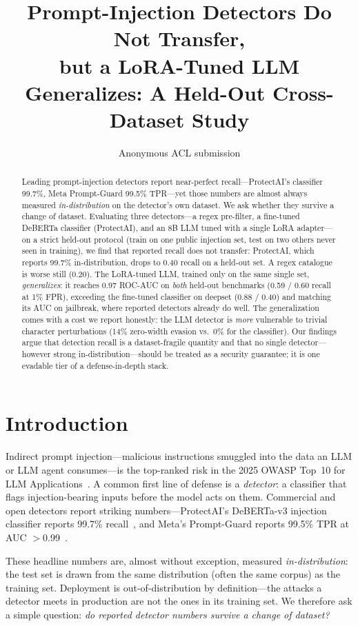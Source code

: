 \documentclass[11pt]{article}
\title{Prompt-Injection Detectors Do Not Transfer, \\ but a LoRA-Tuned LLM Generalizes:
A Held-Out Cross-Dataset Study}
\author{Anonymous ACL submission}
\begin{document}
\maketitle

\begin{abstract}
Leading prompt-injection detectors report near-perfect recall---ProtectAI's classifier 99.7\%,
Meta Prompt-Guard 99.5\% TPR---yet those numbers are almost always measured \emph{in-distribution}
on the detector's own dataset. We ask whether they survive a
change of dataset. Evaluating three detectors---a regex pre-filter, a fine-tuned DeBERTa classifier
(ProtectAI), and an 8B LLM tuned with a single LoRA adapter---on a strict held-out protocol (train
on one public injection set, test on two others never seen in training), we find that reported
recall does not transfer: ProtectAI, which reports 99.7\% in-distribution, drops to 0.40 recall on a
held-out set. A regex catalogue is worse still (0.20). The LoRA-tuned LLM, trained only on the same
single set, \emph{generalizes}: it reaches 0.97 ROC-AUC on \emph{both} held-out benchmarks
(0.59 / 0.60 recall at 1\% FPR), exceeding the fine-tuned classifier on deepset (0.88 / 0.40) and
matching its AUC on jailbreak, where reported detectors already do well. The generalization comes
with a cost we report honestly: the LLM detector is \emph{more} vulnerable to trivial character
perturbations (14\% zero-width evasion vs.\ 0\% for the classifier). Our findings argue that
detection recall is a dataset-fragile quantity and that no single detector---however strong
in-distribution---should be treated as a security guarantee; it is one evadable tier of a
defense-in-depth stack.
\end{abstract}

\section{Introduction}
Indirect prompt injection---malicious instructions smuggled into the data an LLM or LLM agent
consumes---is the top-ranked risk in the 2025 OWASP Top~10 for LLM
Applications~\citep{owasp2025}. A common first line of defense is a \emph{detector}: a classifier
that flags injection-bearing inputs before the model acts on them. Commercial and open detectors
report striking numbers---ProtectAI's DeBERTa-v3 injection classifier reports 99.7\%
recall~\citep{protectai}, and Meta's Prompt-Guard reports 99.5\% TPR at AUC
$>$0.99~\citep{promptguard}.

These headline numbers are, almost without exception, measured \emph{in-distribution}: the test set
is drawn from the same distribution (often the same corpus) as the training set. Deployment is
out-of-distribution by definition---the attacks a detector meets in production are not the ones in
its training set. We therefore ask a simple question: \emph{do reported detector numbers survive a
change of dataset?}
\end{document}
